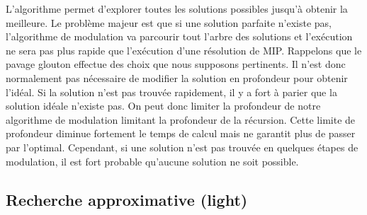 % 
%   
%   
%   
%   
%   
%   


L'algorithme permet d'explorer toutes les solutions possibles jusqu'à obtenir la meilleure.
Le problème majeur est que si une solution parfaite n'existe pas, l'algorithme de modulation va parcourir tout l'arbre des solutions et l'exécution ne sera pas plus rapide que l'exécution d'une résolution de MIP.
Rappelons que le pavage glouton effectue des choix que nous supposons pertinents.
Il n'est donc normalement pas nécessaire de modifier la solution en profondeur pour obtenir l'idéal.
Si la solution n'est pas trouvée rapidement, il y a fort à parier que la solution idéale n'existe pas.
On peut donc limiter la profondeur de notre algorithme de modulation limitant la profondeur de la récursion.
Cette limite de profondeur diminue fortement le temps de calcul mais ne garantit plus de passer par l'optimal.
Cependant, si une solution n'est pas trouvée en quelques étapes de modulation, il est fort probable qu'aucune solution ne soit possible.


\subsection{Recherche approximative (light)}

\label{light_p}

